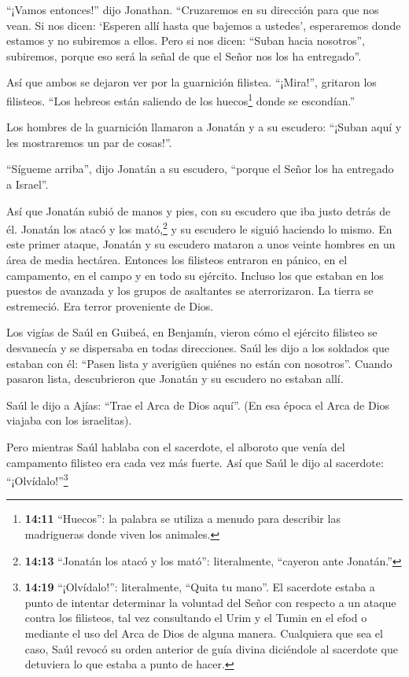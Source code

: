  ``¡Vamos entonces!'' dijo Jonathan. ``Cruzaremos en su
dirección para que nos vean.  Si nos dicen: `Esperen allí
hasta que bajemos a ustedes', esperaremos donde estamos y no subiremos a
ellos.  Pero si nos dicen: ``Suban hacia nosotros'',
subiremos, porque eso será la señal de que el Señor nos los ha
entregado''.

 Así que ambos se dejaron ver por la guarnición filistea.
``¡Mira!'', gritaron los filisteos. ``Los hebreos están saliendo de los
huecos\footnote{\textbf{14:11} ``Huecos'': la palabra se utiliza a
  menudo para describir las madrigueras donde viven los animales.} donde
se escondían.''

 Los hombres de la guarnición llamaron a Jonatán y a su
escudero: ``¡Suban aquí y les mostraremos un par de cosas!''.

``Sígueme arriba'', dijo Jonatán a su escudero, ``porque el Señor los ha
entregado a Israel''.

 Así que Jonatán subió de manos y pies, con su escudero que
iba justo detrás de él. Jonatán los atacó y los mató,\footnote{\textbf{14:13}
  ``Jonatán los atacó y los mató'': literalmente, ``cayeron ante
  Jonatán.''} y su escudero le siguió haciendo lo mismo. 
En este primer ataque, Jonatán y su escudero mataron a unos veinte
hombres en un área de media hectárea.  Entonces los
filisteos entraron en pánico, en el campamento, en el campo y en todo su
ejército. Incluso los que estaban en los puestos de avanzada y los
grupos de asaltantes se aterrorizaron. La tierra se estremeció. Era
terror proveniente de Dios.

 Los vigías de Saúl en Guibeá, en Benjamín, vieron cómo el
ejército filisteo se desvanecía y se dispersaba en todas direcciones.
 Saúl les dijo a los soldados que estaban con él: ``Pasen
lista y averigüen quiénes no están con nosotros''. Cuando pasaron lista,
descubrieron que Jonatán y su escudero no estaban allí.

 Saúl le dijo a Ajías: ``Trae el Arca de Dios aquí''. (En
esa época el Arca de Dios viajaba con los israelitas).

 Pero mientras Saúl hablaba con el sacerdote, el alboroto
que venía del campamento filisteo era cada vez más fuerte. Así que Saúl
le dijo al sacerdote: ``¡Olvídalo!''\footnote{\textbf{14:19}
  ``¡Olvídalo!'': literalmente, ``Quita tu mano''. El sacerdote estaba a
  punto de intentar determinar la voluntad del Señor con respecto a un
  ataque contra los filisteos, tal vez consultando el Urim y el Tumin en
  el efod o mediante el uso del Arca de Dios de alguna manera.
  Cualquiera que sea el caso, Saúl revocó su orden anterior de guía
  divina diciéndole al sacerdote que detuviera lo que estaba a punto de
  hacer.}

